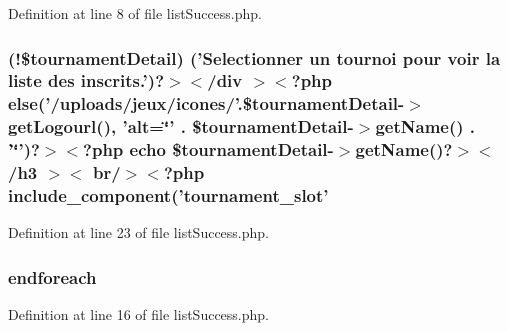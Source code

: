 Definition at line 8 of file list\-Success.\-php.

\hypertarget{frontend_2modules_2tournament_2templates_2list_success_8php_a66a4da4db315f7aff11e218f221c66fe}{
\subsubsection[{('\-Selectionner un tournoi pour voir la liste des inscrits.')?$>$$<$/div $>$$<$?php else}]{(!\$tournament\-Detail) ('Selectionner un tournoi pour voir la liste des inscrits.')?$>$$<$/div $>$$<$?php {\bf else}('/uploads/jeux/icones/'.\$tournament\-Detail-\/$>${\bf get\-Logourl}(), 'alt=\char`\"{}' . \$tournament\-Detail-\/$>$get\-Name() . '\char`\"{}')?$>$$<$?php echo \$tournament\-Detail-\/$>$get\-Name()?$>$$<$/h3 $>$$<$ br/$>$$<$?php {\bf include\-\_\-component}('tournament\-\_\-slot'}}\label{frontend_2modules_2tournament_2templates_2list_success_8php_a66a4da4db315f7aff11e218f221c66fe}


Definition at line 23 of file list\-Success.\-php.

\hypertarget{frontend_2modules_2tournament_2templates_2list_success_8php_a672d9707ef91db026c210f98cc601123}{
\subsubsection[{endforeach}]{\setlength{\rightskip}{0pt plus 5cm}endforeach}}\label{frontend_2modules_2tournament_2templates_2list_success_8php_a672d9707ef91db026c210f98cc601123}


Definition at line 16 of file list\-Success.\-php.

